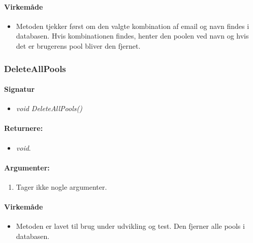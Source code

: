 \paragraph{Virkemåde}
\begin{itemize}
	\item Metoden tjekker først om den valgte kombination af email og navn findes i databasen. Hvis kombinationen findes, henter den poolen ved navn og hvis det er brugerens pool bliver den fjernet.
\end{itemize}

\subsubsection{DeleteAllPools}%


\paragraph{Signatur}
\begin{itemize}
	\item \textit{void DeleteAllPools()}
\end{itemize}

\paragraph{Returnere:}
\begin{itemize}
	\item \textit{void}.
\end{itemize}

\paragraph{Argumenter:}
\begin{enumerate}
	\item Tager ikke nogle argumenter.
\end{enumerate}

\paragraph{Virkemåde}
\begin{itemize}
	\item Metoden er lavet til brug under udvikling og test. Den fjerner alle pools i databasen.
\end{itemize}






